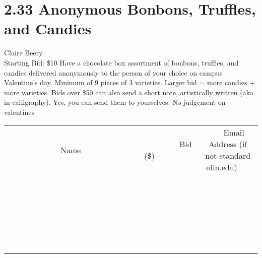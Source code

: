\documentclass[11pt]{article}
\begin{document}
\section*{2.33 Anonymous Bonbons, Truffles, and Candies}
Claire Beery
\\
Starting Bid: \$10
\newline
Have a chocolate box assortment of bonbons, truffles, and candies delivered anonymously to the person of your choice on campus Valentine's day. Minimum of 9 pieces of 3 varieties. Larger bid = more candies + more varieties. Bids over \$50 can also send a short note, artistically written (aka in calligraphy). Yes, you can send them to yourselves. No judgement on valentines
\\[6ex]
\begin{tabular}{c c c}
~~~~~~~~~~~~~Name~~~~~~~~~~~~~ & ~~~~~~~~~Bid (\$)~~~~~~~~~  & ~~~Email Address (if not standard olin.edu)~~~\\
 & & \\
\hline
 & & \\
\hline
 & & \\
\hline
 & & \\
\hline
 & & \\
\hline
 & & \\
\hline
 & & \\
\hline
 & & \\
\hline
 & & \\
\hline
 & & \\
\hline
 & & \\
\hline
 & & \\
\hline
 & & \\
\hline
 & & \\
\hline
 & & \\
\hline
 & & \\
\hline
 & & \\
\hline
 & & \\
\hline
 & & \\
\hline
 & & \\
\hline
 & & \\
\hline
 & & \\
\hline
 & & \\
\hline
 & & \\
\hline
 & & \\
\hline
 & & \\
\hline
\end{tabular}
\newpage
\end{document}
